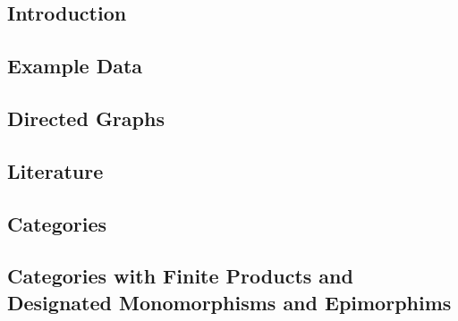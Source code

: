 \subsection{Introduction}


\subsection{Example Data}


\subsection{Directed Graphs}


\subsection{Literature}


\fi

\subsection{Categories}


\iffalse
\subsection{Categories with Designated Monomorphisms and Epimorphims}

\fi

\subsection{Categories with Finite Products and Designated Monomorphisms and Epimorphims}



\iffalse

\subsection{Entity-Relationship Notation}


\subsection{Unused}

\fi

